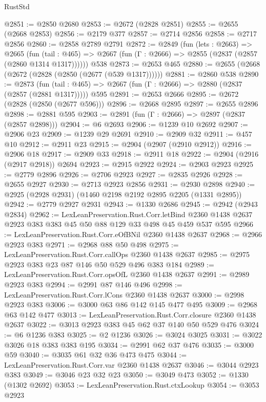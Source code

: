 \begin{lexlean}{RustStd}
\begin{coremodule}
@2851 := @2850 @2680
@2853 := @2672 (@2828 @2851)
@2855 := @2655 (@2668 @2853)
@2856 := @2179 @377
@2857 := @2714 @2856
@2858 := @2717 @2856
@2860 := @2858 @2789 @2791
@2872 := @2849
    (fun (lets : @2663) =>
    @2665
      (fun (tail : @465) => @2667 (fun (Γ : @2666) => @2855 (@2837 (@2857 (@2860 @1314 @1317))))))
    @538
@2873 := @2653 @465
@2880 := @2655 (@2668 (@2672 (@2828 (@2850 (@2677 (@539 @1317))))))
@2881 := @2860 @538
@2890 := @2873
    (fun (tail : @465) => @2667 (fun (Γ : @2666) => @2880 (@2837 (@2857 (@2881 @1317)))))
    @595
@2891 := @2653 @2666
@2895 := @2672 (@2828 (@2850 (@2677 @596)))
@2896 := @2668 @2895
@2897 := @2655 @2896
@2898 := @2881 @595
@2903 := @2891 (fun (Γ : @2666) => @2897 (@2837 (@2857 @2898)))
@2904 := @6 @2693
@2906 := @1239 @10 @2692
@2907 := @2906 @23
@2909 := @1239 @29 @2691
@2910 := @2909 @32
@2911 := @457 @10
@2912 := @2911 @23
@2915 := @2904 (@2907 (@2910 @2912))
@2916 := @2906 @18
@2917 := @2909 @33
@2918 := @2911 @18
@2922 := @2904 (@2916 (@2917 @2918)) @2694
@2923 := @2915 @2922
@2924 := @2903 @2923
@2925 := @2779 @2896
@2926 := @2706 @2923
@2927 := @2835 @2926
@2928 := @2655 @2927
@2930 := @2713 @2923 @2856
@2931 := @2930 @2898
@2940 := @2925 (@2928 @2931) (@1460 @2198 @2192 @2895 @2205 (@1331 @2895))
@2942 := @2779 @2927 @2931
@2943 := @1330 @2686
@2945 := @2942 (@2943 @2834)
@2962 := LexLeanPreservation.Rust.Corr.letBind
    @2360
    @1438
    @2637
    @2923
    @383
    @383
    @45
    @50
    @88
    @129
    @33
    @498
    @45
    @459
    @537
    @595
@2966 := LexLeanPreservation.Rust.Corr.eOfBNil @2360 @1438 @2637
@2968 := @2966 @2923 @383
@2971 := @2968 @88 @50 @498
@2975 := LexLeanPreservation.Rust.Corr.callOps @2360 @1438 @2637
@2985 := @2975 @2923 @383 @23 @87 @146 @50 @529 @496 @383 @184
@2989 := LexLeanPreservation.Rust.Corr.opsOfL @2360 @1438 @2637
@2991 := @2989 @2923 @383
@2994 := @2991 @87 @146 @496
@2998 := LexLeanPreservation.Rust.Corr.lCons @2360 @1438 @2637
@3000 := @2998 @2923 @383
@3006 := @3000 @63 @86 @142 @145 @477 @495
@3009 := @2968 @63 @142 @477
@3013 := LexLeanPreservation.Rust.Corr.closure @2360 @1438 @2637
@3022 := @3013 @2923 @383 @45 @62 @37 @140 @50 @529 @476
@3024 := @6 @1236 @383
@3025 := @2 @1236
@3026 := @3024 @3025
@3031 := @3022 @3026 @18 @383 @383 @195
@3034 := @2991 @62 @37 @476
@3035 := @3000 @59
@3040 := @3035 @61 @32 @36 @473 @475
@3044 := LexLeanPreservation.Rust.Corr.var @2360 @1438 @2637
@3046 := @3044 @2923 @383
@3049 := @3046 @23 @32 @23
@3050 := @3049 @473
@3052 := @1330 (@1302 @2692)
@3053 := LexLeanPreservation.Rust.ctxLookup
@3054 := @3053 @2923

\end{coremodule}
\end{lexlean}
